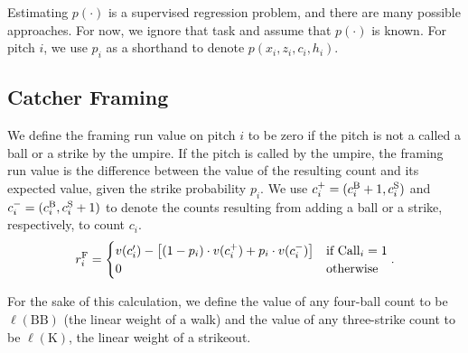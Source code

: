 \documentclass{article}
\begin{document}
    Estimating $p(\cdot)$ is a supervised regression problem, and there are many possible approaches. For now, we ignore that task and assume that $p(\cdot)$ is known. For pitch $i$, we use $p_i$ as a shorthand to denote $p(x_i, z_i, c_i, h_i)$.

  \subsection{\sc Catcher Framing}

    We define the framing run value on pitch $i$ to be zero if the pitch is not a called a ball or a strike by the umpire. If the pitch is called by the umpire, the framing run value is the difference between the value of the resulting count and its expected value, given the strike probability $p_i$. We use $c_i^+ = (c_i^{\mbox{\scriptsize B}} + 1, c_i^{\mbox{\scriptsize S}})$ and $c_i^- = (c_i^{\mbox{\scriptsize B}}, c_i^{\mbox{\scriptsize S}} + 1)$ to denote the counts resulting from adding a ball or a strike, respectively, to count $c_i$.
    \begin{equation*}
      r_i^{\mbox{\scriptsize F}} = \begin{cases}
        v(c'_i) - \left[(1 - p_i) \cdot v(c_i^+) + p_i \cdot v(c_i^-)\right] & \mbox{if Call}_i = 1\\
        0 & \mbox{otherwise}
      \end{cases}.
    \end{equation*}

    For the sake of this calculation, we define the value of any four-ball count to be $\ell(\mbox{BB})$ (the linear weight of a walk) and the value of any three-strike count to be $\ell(\mbox{K})$, the linear weight of a strikeout.
\end{document}

